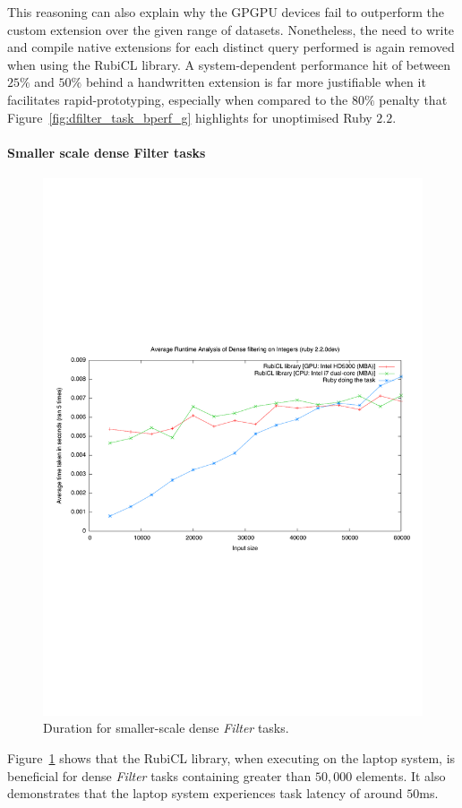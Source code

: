 This reasoning can also explain why the \ac{GPGPU} devices fail to outperform the custom extension over the given range of datasets.
Nonetheless, the need to write and compile native extensions for each distinct query performed is again removed when using the RubiCL library. A system-dependent performance hit of between $25\%$ and $50\%$ behind a handwritten extension is far more justifiable when it facilitates rapid-prototyping, especially when compared to the $80\%$ penalty that Figure~\ref{fig:dfilter_task_bperf_g} highlights for unoptimised Ruby $2.2$.

\paragraph*{Smaller scale dense Filter tasks}
\begin{figure}[H]
  \includegraphics[trim=0cm 8cm 0cm 8cm, clip=true, width=\textwidth]{./graphing/smalldensefilter.pdf}
  \caption{Duration for smaller-scale dense \emph{Filter} tasks.}
  \label{fig:densefil_tasksmallrun}
\end{figure}
Figure~\ref{fig:densefil_tasksmallrun} shows that the RubiCL library, when executing on the laptop system, is beneficial for dense \emph{Filter} tasks containing greater than $50,000$ elements. It also demonstrates that the laptop system experiences task latency of around $50$ms.

